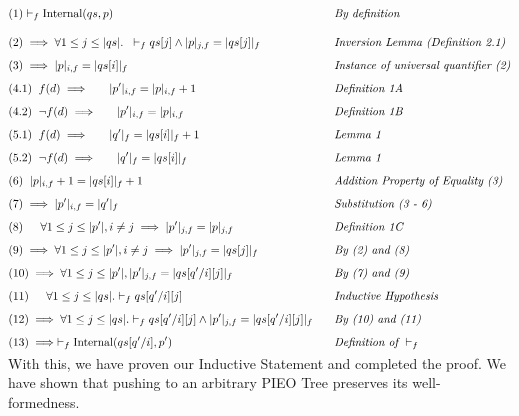 \documentclass{amsart}
\begin{document}
\begin{alignat*}{5}
&(1) \vdash_f \text{Internal}(qs, p) && \hspace{0.3cm} \textit{By definition}\\[10pt]
&(2) \implies \forall 1 \leq j \leq |qs|. \hspace{0.2cm} \vdash_f qs[j] \land |p|_{j, f} = |qs[j]|_f&& \hspace{0.3cm} \textit{Inversion Lemma (Definition 2.1)}\\[5pt]
&(3) \implies |p|_{i, f} = |qs[i]|_f&& \hspace{0.3cm} \textit{Instance of universal quantifier (2)}\\[5pt]
&(4.1)  \hspace{0.2cm} f(d) \implies \indent |p'|_{i, f} = |p|_{i, f} + 1&& \hspace{0.3cm} \textit{Definition 1A}\\[5pt]
&(4.2)  \hspace{0.2cm} \neg f(d) \implies \indent |p'|_{i, f} = |p|_{i, f} && \hspace{0.3cm} \textit{Definition 1B}\\[5pt]
&(5.1) \hspace{0.2cm} f(d) \implies \indent |q'|_f = |qs[i]|_f + 1&& \hspace{0.3cm} \textit{Lemma 1}\\[5pt]
&(5.2) \hspace{0.2cm}  \neg f(d) \implies \indent |q'|_f = |qs[i]|_f && \hspace{0.3cm} \textit{Lemma 1}\\[5pt]
&(6) \hspace{0.2cm} |p|_{i, f} + 1 = |qs[i]|_f + 1&& \hspace{0.3cm} \textit{Addition Property of Equality (3)}\\[5pt]
&(7) \implies |p'|_{i, f} = |q'|_f && \hspace{0.3cm} \textit{Substitution (3 - 6)}\\[5pt]
&(8) \indent \forall 1 \leq j \leq |p'|, i \neq j \implies |p'|_{j, f} = |p|_{j, f}&& \hspace{0.3cm} \textit{Definition 1C}\\[5pt]
&(9) \implies \forall 1 \leq j \leq |p'|, i \neq j \implies |p'|_{j, f} = |qs[j]|_f&& \hspace{0.3cm} \textit{By (2) and (8)}\\[5pt]
&(10) \implies \forall 1 \leq j \leq |p'|, |p'|_{j, f} = |qs[q' / i][j]|_f&& \hspace{0.3cm} \textit{By (7) and (9)}\\[5pt]
&(11)  \indent \forall 1 \leq j \leq |qs|. \vdash_f qs[q'/i][j] && \hspace{0.3cm} \textit{Inductive Hypothesis}\\[5pt]
&(12) \implies \forall 1 \leq j \leq |qs|. \vdash_f qs[q'/i][j] \land |p'|_{j, f} = |qs[q'/i][j]|_f&&\hspace{0.3cm} \textit{By (10) and (11)}\\[5pt]
&(13) \implies \vdash_f \text{Internal}(qs[q'/i], p') && \hspace{0.3cm} \textit{Definition of } \vdash_f\\[-10pt]
\end{alignat*}

With this, we have proven our Inductive Statement and completed the proof. We have shown that pushing to an arbitrary PIEO Tree preserves its well-formedness.\\[-10pt]
\end{document}
